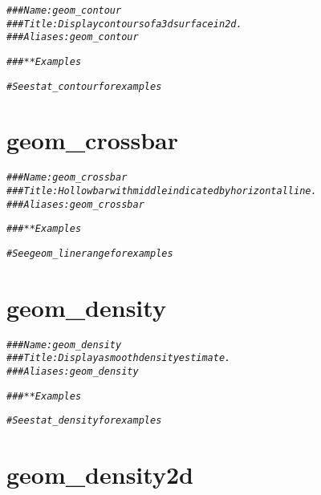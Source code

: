 \documentclass[a4paper,titlepage]{tufte-handout}\usepackage[]{graphicx}\usepackage[]{color}
\makeatletter
\newcommand{\hlcom}[1]{\textcolor[rgb]{0.678,0.584,0.686}{\textit{#1}}}%
\newenvironment{kframe}{%
 \def\at@end@of@kframe{}%
 \ifinner\ifhmode%
  \def\at@end@of@kframe{\end{minipage}}%
  \begin{minipage}{\columnwidth}%
 \fi\fi%
 \def\FrameCommand##1{\hskip\@totalleftmargin \hskip-\fboxsep
 \colorbox{shadecolor}{##1}\hskip-\fboxsep
     \hskip-\linewidth \hskip-\@totalleftmargin \hskip\columnwidth}%
 \MakeFramed {\advance\hsize-\width
   \@totalleftmargin\z@ \linewidth\hsize
   \@setminipage}}%
 {\par\unskip\endMakeFramed%
 \at@end@of@kframe}
\newenvironment{knitrout}{}{} %
\makeatother
\begin{document}
\begin{knitrout}
\color{fgcolor}\begin{kframe}
\begin{alltt}
\hlcom{### Name: geom_contour}
\hlcom{### Title: Display contours of a 3d surface in 2d.}
\hlcom{### Aliases: geom_contour}

\hlcom{### ** Examples}

\hlcom{# See stat_contour for examples}
\end{alltt}
\end{kframe}
\end{knitrout}


\section{geom\_crossbar}

\begin{knitrout}
\color{fgcolor}\begin{kframe}
\begin{alltt}
\hlcom{### Name: geom_crossbar}
\hlcom{### Title: Hollow bar with middle indicated by horizontal line.}
\hlcom{### Aliases: geom_crossbar}

\hlcom{### ** Examples}

\hlcom{# See geom_linerange for examples}
\end{alltt}
\end{kframe}
\end{knitrout}


\section{geom\_density}

\begin{knitrout}
\color{fgcolor}\begin{kframe}
\begin{alltt}
\hlcom{### Name: geom_density}
\hlcom{### Title: Display a smooth density estimate.}
\hlcom{### Aliases: geom_density}

\hlcom{### ** Examples}

\hlcom{# See stat_density for examples}
\end{alltt}
\end{kframe}
\end{knitrout}


\section{geom\_density2d}
\end{document}
